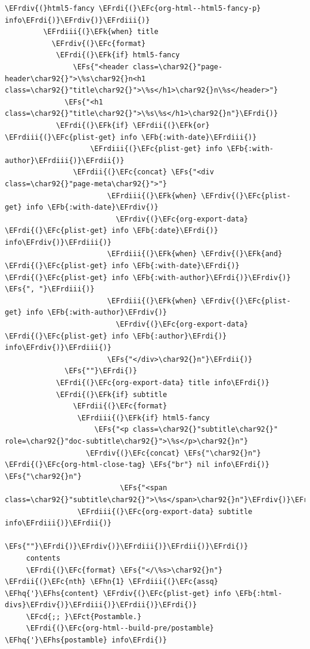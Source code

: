 \documentclass{scrartcl}
\newcommand{\EFk}[1]{\textcolor{EFk}{#1}} %
\newcommand{\EFs}[1]{\textcolor{EFs}{#1}} %
\newcommand{\EFb}[1]{\textcolor{EFb}{#1}} %
\newcommand{\EFct}[1]{\textcolor{EFct}{#1}} %
\newcommand{\EFc}[1]{\textcolor{EFc}{#1}} %
\newcommand{\EFcd}[1]{\textcolor{EFcd}{#1}} %
\newcommand{\EFhn}[1]{#1} %
\newcommand{\EFhq}[1]{#1} %
\newcommand{\EFhs}[1]{#1} %
\newcommand{\EFrdi}[1]{#1} %
\newcommand{\EFrdii}[1]{#1} %
\newcommand{\EFrdiii}[1]{#1} %
\newcommand{\EFrdiv}[1]{#1} %
\begin{document}
\begin{Code}
\begin{Verbatim}[]
             \EFrdiv{(}html5-fancy \EFrdi{(}\EFc{org-html--html5-fancy-p} info\EFrdi{)}\EFrdiv{)}\EFrdiii{)}
         \EFrdiii{(}\EFk{when} title
           \EFrdiv{(}\EFc{format}
            \EFrdi{(}\EFk{if} html5-fancy
                \EFs{"<header class=\char92{}"page-header\char92{}">\%s\char92{}n<h1 class=\char92{}"title\char92{}">\%s</h1>\char92{}n\%s</header>"}
              \EFs{"<h1 class=\char92{}"title\char92{}">\%s\%s</h1>\char92{}n"}\EFrdi{)}
            \EFrdi{(}\EFk{if} \EFrdii{(}\EFk{or} \EFrdiii{(}\EFc{plist-get} info \EFb{:with-date}\EFrdiii{)}
                    \EFrdiii{(}\EFc{plist-get} info \EFb{:with-author}\EFrdiii{)}\EFrdii{)}
                \EFrdii{(}\EFc{concat} \EFs{"<div class=\char92{}"page-meta\char92{}">"}
                        \EFrdiii{(}\EFk{when} \EFrdiv{(}\EFc{plist-get} info \EFb{:with-date}\EFrdiv{)}
                          \EFrdiv{(}\EFc{org-export-data} \EFrdi{(}\EFc{plist-get} info \EFb{:date}\EFrdi{)} info\EFrdiv{)}\EFrdiii{)}
                        \EFrdiii{(}\EFk{when} \EFrdiv{(}\EFk{and} \EFrdi{(}\EFc{plist-get} info \EFb{:with-date}\EFrdi{)} \EFrdi{(}\EFc{plist-get} info \EFb{:with-author}\EFrdi{)}\EFrdiv{)} \EFs{", "}\EFrdiii{)}
                        \EFrdiii{(}\EFk{when} \EFrdiv{(}\EFc{plist-get} info \EFb{:with-author}\EFrdiv{)}
                          \EFrdiv{(}\EFc{org-export-data} \EFrdi{(}\EFc{plist-get} info \EFb{:author}\EFrdi{)} info\EFrdiv{)}\EFrdiii{)}
                        \EFs{"</div>\char92{}n"}\EFrdii{)}
              \EFs{""}\EFrdi{)}
            \EFrdi{(}\EFc{org-export-data} title info\EFrdi{)}
            \EFrdi{(}\EFk{if} subtitle
                \EFrdii{(}\EFc{format}
                 \EFrdiii{(}\EFk{if} html5-fancy
                     \EFs{"<p class=\char92{}"subtitle\char92{}" role=\char92{}"doc-subtitle\char92{}">\%s</p>\char92{}n"}
                   \EFrdiv{(}\EFc{concat} \EFs{"\char92{}n"} \EFrdi{(}\EFc{org-html-close-tag} \EFs{"br"} nil info\EFrdi{)} \EFs{"\char92{}n"}
                           \EFs{"<span class=\char92{}"subtitle\char92{}">\%s</span>\char92{}n"}\EFrdiv{)}\EFrdiii{)}
                 \EFrdiii{(}\EFc{org-export-data} subtitle info\EFrdiii{)}\EFrdii{)}
              \EFs{""}\EFrdi{)}\EFrdiv{)}\EFrdiii{)}\EFrdii{)}\EFrdi{)}
     contents
     \EFrdi{(}\EFc{format} \EFs{"</\%s>\char92{}n"} \EFrdii{(}\EFc{nth} \EFhn{1} \EFrdiii{(}\EFc{assq} \EFhq{'}\EFhs{content} \EFrdiv{(}\EFc{plist-get} info \EFb{:html-divs}\EFrdiv{)}\EFrdiii{)}\EFrdii{)}\EFrdi{)}
     \EFcd{;; }\EFct{Postamble.}
     \EFrdi{(}\EFc{org-html--build-pre/postamble} \EFhq{'}\EFhs{postamble} info\EFrdi{)}

\end{Verbatim}
\end{Code}
\end{document}
